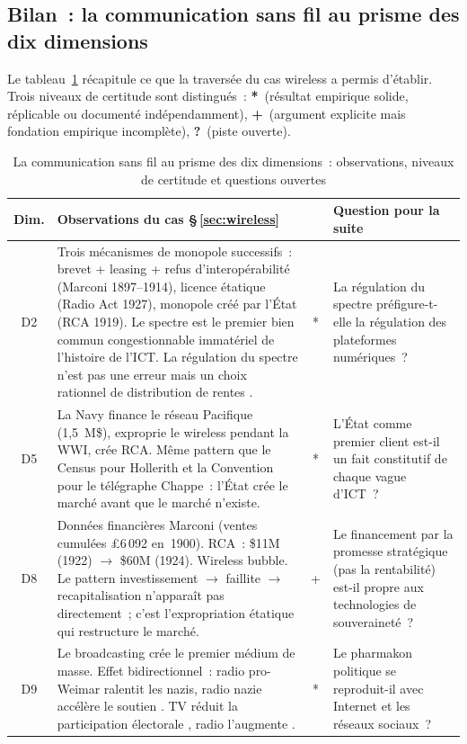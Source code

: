 \subsection*{Bilan~: la communication sans fil au prisme des dix dimensions}\label{subsec:bilan_wireless}

Le tableau~\ref{tab:wireless-dimensions} récapitule ce que la traversée du cas wireless a permis d'établir. Trois niveaux de certitude sont distingués~: \textbf{*}~(résultat empirique solide, réplicable ou documenté indépendamment), \textbf{+}~(argument explicite mais fondation empirique incomplète), \textbf{?}~(piste ouverte).

\begin{table}[p]
\caption{La communication sans fil au prisme des dix dimensions~: observations, niveaux de certitude et questions ouvertes}\label{tab:wireless-dimensions}
\centering\footnotesize
\renewcommand{\arraystretch}{1.15}
\begin{tabularx}{\textwidth}{@{}cXcp{4.5cm}@{}}
\toprule
\textbf{Dim.} & \textbf{Observations du cas §\,\ref{sec:wireless}} & & \textbf{Question pour la suite} \\
\midrule
D2 & Trois mécanismes de monopole successifs~: brevet + leasing + refus d'interopérabilité (Marconi 1897--1914), licence étatique (Radio Act 1927), monopole créé par l'État (RCA 1919). Le spectre est le premier bien commun congestionnable immatériel de l'histoire de l'ICT. La régulation du spectre n'est pas une erreur mais un choix rationnel de distribution de rentes \parencite{hazlett_rationality_1990}. & * & La régulation du spectre préfigure-t-elle la régulation des plateformes numériques~? \\[3pt]
D5 & La Navy finance le réseau Pacifique (1,5~M\$), exproprie le wireless pendant la WWI, crée RCA. Même pattern que le Census pour Hollerith et la Convention pour le télégraphe Chappe~: l'État crée le marché avant que le marché n'existe. & * & L'État comme premier client est-il un fait constitutif de chaque vague d'ICT~? \\[3pt]
D8 & Données financières Marconi (ventes cumulées £6\,092 en~1900). RCA~: \$11M (1922) $\rightarrow$ \$60M (1924). Wireless bubble. Le pattern investissement $\rightarrow$ faillite $\rightarrow$ recapitalisation n'apparaît pas directement~; c'est l'expropriation étatique qui restructure le marché. & + & Le financement par la promesse stratégique (pas la rentabilité) est-il propre aux technologies de souveraineté~? \\[3pt]
D9 & Le broadcasting crée le premier médium de masse. Effet bidirectionnel~: radio pro-Weimar ralentit les nazis, radio nazie accélère le soutien \parencite{adena_radio_2015}. TV réduit la participation électorale \parencite{gentzkow_television_2006}, radio l'augmente \parencite{stromberg_radio_2004}. & * & Le pharmakon politique se reproduit-il avec Internet et les réseaux sociaux~? \\[3pt]

\end{tabularx}
\end{table}
